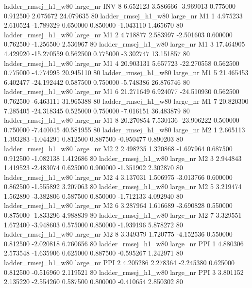 ladder_rmsej_h1_w80   large_nr      INV                 8  6.652123  3.586666  -3.969013 0.775000 0.912500  2.075672   24.079635 80
ladder_rmsej_h1_w80   large_nr       M1                 1  4.975233  2.610524  -1.789329 0.650000 0.850000 -1.043110    1.465670 80
ladder_rmsej_h1_w80   large_nr       M1                 2  4.718877  2.583997  -2.501603 0.600000 0.762500 -1.256500    2.536967 80
ladder_rmsej_h1_w80   large_nr       M1                 3 17.464905  4.429920 -15.270559 0.562500 0.775000 -3.302747   13.151857 80
ladder_rmsej_h1_w80   large_nr       M1                 4 20.903131  5.657723 -22.270558 0.562500 0.775000 -4.774995   20.945110 80
ladder_rmsej_h1_w80   large_nr       M1                 5 21.465453  6.402477 -24.192442 0.587500 0.750000 -5.748386   26.876746 80
ladder_rmsej_h1_w80   large_nr       M1                 6 21.271649  6.924077 -24.510930 0.562500 0.762500 -6.463111   31.965388 80
ladder_rmsej_h1_w80   large_nr       M1                 7 20.820300  7.285405 -24.318345 0.525000 0.750000 -7.016151   36.483879 80
ladder_rmsej_h1_w80   large_nr       M1                 8 20.270854  7.530136 -23.906222 0.500000 0.750000 -7.440045   40.581955 80
ladder_rmsej_h1_w80   large_nr       M2                 1  2.665113  1.393283  -1.044291 0.812500 0.887500 -0.950477    0.890203 80
ladder_rmsej_h1_w80   large_nr       M2                 2  2.498235  1.320868  -1.697964 0.687500 0.912500 -1.082138    1.412686 80
ladder_rmsej_h1_w80   large_nr       M2                 3  2.944843  1.419523  -2.483074 0.625000 0.900000 -1.351902    2.302870 80
ladder_rmsej_h1_w80   large_nr       M2                 4  3.137031  1.506975  -3.013766 0.600000 0.862500 -1.555892    3.207063 80
ladder_rmsej_h1_w80   large_nr       M2                 5  3.219474  1.562890  -3.382806 0.587500 0.850000 -1.712133    4.092940 80
ladder_rmsej_h1_w80   large_nr       M2                 6  3.287964  1.616689  -3.690828 0.550000 0.875000 -1.833296    4.988839 80
ladder_rmsej_h1_w80   large_nr       M2                 7  3.329551  1.672400  -3.948603 0.575000 0.850000 -1.939196    5.878272 80
ladder_rmsej_h1_w80   large_nr       M2                 8  3.349379  1.720775  -4.152536 0.550000 0.812500 -2.020818    6.760656 80
ladder_rmsej_h1_w80   large_nr      PPI                 1  4.880306  2.573548  -1.635906 0.625000 0.887500 -0.595267    1.242971 80
ladder_rmsej_h1_w80   large_nr      PPI                 2  4.205286  2.278364  -2.245380 0.625000 0.812500 -0.516960    2.119521 80
ladder_rmsej_h1_w80   large_nr      PPI                 3  3.801152  2.135220  -2.554260 0.587500 0.800000 -0.410654    2.850302 80
